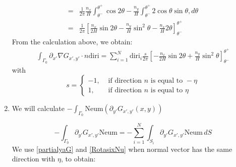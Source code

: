 \documentclass[a4paper,12pt]{article}
\newcommand{\integ}[3]{%
\ensuremath{\displaystyle{\int^{#2}_{#1} #3}}}
\begin{document}
\begin{enumerate}
\begin{align}
=& \frac{1}{2\pi} \frac{n_x}{H} \integ{\theta^-}{\theta^+}{\cos 2\theta}-\frac{n_y}{H}\integ{\theta^-}{\theta^+}{2\cos \theta \sin\theta, d\theta}\\
=& \frac{1}{2\pi} \left[\frac{n_x}{2H}\sin2\theta-\frac{n_y}{H}\sin^2\theta-\frac{n_x}{H} 2 \theta \right]_{\theta^-}^{\theta^+}\label{intPartialxaNablaGn1}
\end{align}
From the calculation above, we obtain:
\begin{align}
 \integ{\Gamma_0}{}{\partial_{x'}\nabla G_{x',y'} \cdot n \text{diri}}=\sum\limits_{i=1}^N \text{diri}_i\frac{s}{2\pi} \left[-\frac{n_x}{2H}\sin2\theta+\frac{n_y}{H}\sin^2\theta \right]_{\theta^-}^{\theta^+}
\end{align}
with
 \[
 s=\left\{ \begin{array}{ll}
    -1, & \text{ if direction } n \text{ is equal to }-\eta\\
    1, & \text{ if direction } n \text{ is equal to } \eta
   \end{array}\right.
\]

\item We will calculate $-\integ{\Gamma_0}{}{\text{Neum} \left(\partial_{y'}G_{x',y'}(x,y)\right)}$

\begin{equation}
 -\integ{\Gamma_0}{}{\partial_{y'} G_{x',y'} \text{Neum}}=-\sum\limits_{i=1}^N  \integ{S_i}{}{\partial_{y'} G_{x',y'} \text{Neum} \, dS}
\end{equation}
We use \ref{partialyaG} and \ref{RotasixNu} when normal vector has the same direction with $\eta$, to obtain:


\end{enumerate}
\end{document}
